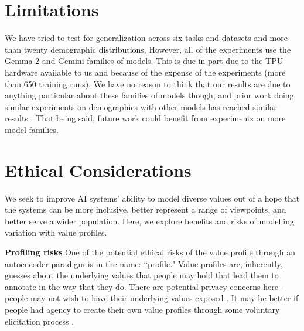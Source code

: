\documentclass[11pt]{article}
\begin{document}
\section{Limitations}
\label{sec:limitations}
We have tried to test for generalization across six tasks and datasets and more than twenty demographic distributions, However, all of the experiments use the Gemma-2 \citep{gemmateam2024gemma2improvingopen} and Gemini \citep{geminiteam2024gemini15unlockingmultimodal} families of models. This is due in part due to the TPU hardware available to us and because of the expense of the experiments (more than 650 training runs). We have no reason to think that our results are due to anything particular about these families of models though, and prior work doing similar experiments on demographics with other models has reached similar results \citep{orlikowski-etal-2023-ecological, hwang2023aligninglanguagemodelsuser}. That being said, future work could benefit from experiments on more model families.

\section{Ethical Considerations}
\label{sec:ethicalconsiderations}

We seek to improve AI systems' ability to model diverse values out of a hope that the systems can be more inclusive, better represent a range of viewpoints, and better serve a wider population. Here, we explore benefits and risks of modelling variation with value profiles.

\textbf{Profiling risks}
One of the potential ethical risks of the value profile through an autoencoder paradigm is in the name: ``profile." Value profiles are, inherently, guesses about the underlying values that people may hold that lead them to annotate in the way that they do. There are potential privacy concerns here - people may not wish to have their underlying values exposed \citep{tomasev-etal}.
It may be better if people had agency to create their own value profiles through some voluntary elicitation process \citep{park2024generativeagentsimulations1000}.
\end{document}
